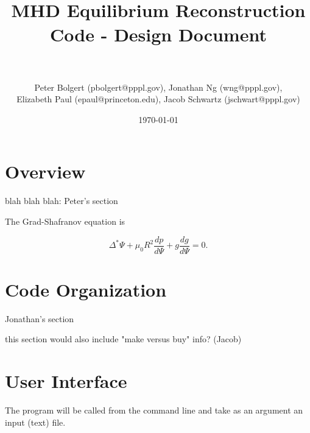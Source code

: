 \documentclass[paper=a4, fontsize=11pt]{scrartcl} %
\title{	
\normalfont \normalsize 
\horrule{0.5pt} \\[0.4cm] %
\huge  MHD Equilibrium Reconstruction Code - Design Document\\ %
\horrule{2pt} \\[0.5cm] %
}
\author{Peter Bolgert (pbolgert@pppl.gov), Jonathan Ng (wng@pppl.gov), \\ Elizabeth Paul (epaul@princeton.edu), Jacob Schwartz (jschwart@pppl.gov)} %
\date{\normalsize\today} %
\numberwithin{equation}{section} %
\numberwithin{figure}{section} %
\numberwithin{table}{section} %
\begin{document}
\maketitle %


\section{Overview}

blah blah blah: Peter's section

The Grad-Shafranov equation is

\begin{equation}
\Delta^{*} \Psi + \mu_0 R^2 \frac{dp}{d\Psi} + g \frac{dg}{d\Psi} = 0.
\end{equation}



\section{Code Organization}

Jonathan's section
\newline

this section would also include "make versus buy" info? (Jacob)


\section{User Interface}

The program will be called from the command line and take as an argument an input (text) file. 
\end{document}
